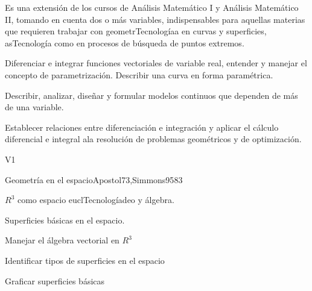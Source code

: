 
\begin{syllabus}


\begin{justification}
Es una extensión de los cursos de Análisis Matemático I y Análisis Matemático II, tomando en cuenta dos o más variables, indispensables para aquellas materias que requieren trabajar con geometrTecnologíaa en curvas y superficies, asTecnología como en procesos de búsqueda de puntos extremos.
\end{justification}

\begin{goals}
\item Diferenciar e integrar funciones vectoriales de variable real, entender y manejar el concepto de parametrización. Describir una curva en forma paramétrica.
\item Describir, analizar, diseñar y formular modelos continuos que dependen de más de una variable.
\item Establecer relaciones entre diferenciación e integración y aplicar el cálculo diferencial e integral ala resolución de problemas geométricos y de optimización.
\end{goals}

\begin{outcomes}{V1}
\end{outcomes}

\begin{unit}{Geometría en el espacio}{}{Apostol73,Simmons95}{8}{3}
   \begin{topics}
      \item $R^3$ como espacio euclTecnologíadeo y álgebra.
      \item Superficies básicas en el espacio.
   \end{topics}

   \begin{learningoutcomes}
      \item Manejar el álgebra vectorial en $R^3$
      \item Identificar tipos de superficies en el espacio
      \item Graficar superficies básicas
      \end{learningoutcomes}
\end{unit}


\end{syllabus}

